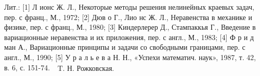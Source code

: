 \documentclass[10pt]{article}
\begin{document}
Лит.: [1] Л ионс Ж. Л., Некоторые методы решения нелинейных краевых задач, пер. с франц., М., 1972; [2] Дюв о Г., Лио нс Ж. Л., Неравенства в механике и физике, пер. с франц., М., 1980; [3] Киндерлерер Д., Стампаккья Г., Введение в вариационные неравенства и их приложения, пер. с англ., М., 1983; [4] Ф р и д ман А., Вариационные принципы и задачи со свободными границами, пер. с англ., М., 1990; [5] У р а л ь е в а Н. Н., «Успехи математич. наук», 1987, т. 42, в. 6, с. 151-74. $\begin{array}{ll}\text { T. Н. Рожковская. }\end{array}$
\end{document}
